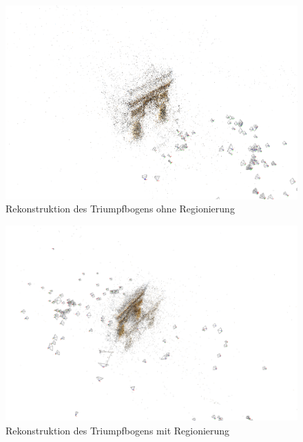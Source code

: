 \begin{figure}[h]
\centering
\includegraphics[height=0.34\textheight]{gfx/arcohne.png}
\caption[Rekonstruktion des Triumpfbogens ohne Regionierung]{Rekonstruktion des Triumpfbogens ohne Regionierung}
\label{gr:arcohne}
\end{figure}
\FloatBarrier

\begin{figure}[h]
\centering
\includegraphics[height=0.34\textheight]{gfx/arcmit.png}
\caption[Rekonstruktion des Triumpfbogens mit Regionierung]{Rekonstruktion des Triumpfbogens mit Regionierung}
\label{gr:arcmit}
\end{figure}
\FloatBarrier

